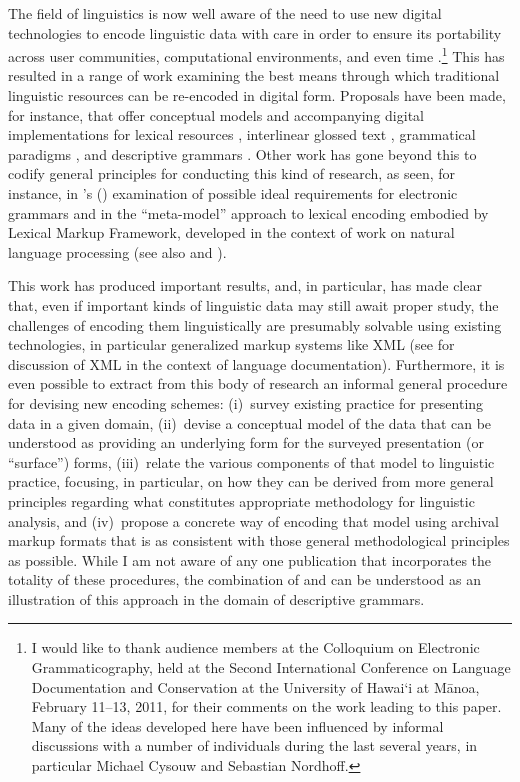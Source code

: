 \documentclass[12pt]{article}
\newcommand\namecite{\citet}
\newcommand{\quotecite}[1]{\citeauthor{#1}'s (\citeyear{#1})}
\renewcommand\cite{\citep}
\begin{document}
The field of linguistics is now well aware of the need to use new digital
technologies to encode linguistic data with care in order to ensure its
portability across user communities, computational environments, and even time
\cite{Bir:Sim:03}.{\footnote{I would like to thank audience members at the
Colloquium on Electronic Grammaticography, held at the Second International
Conference on Language Documentation and Conservation at the University of
Hawai`i at M\=anoa, February 11--13, 2011, for their comments on the work
leading to this paper. Many of the ideas developed here have been influenced by
informal discussions with a number of individuals during the last several years,
in particular Michael Cysouw and Sebastian Nordhoff.}} This has resulted in a
range of work examining the best means through which traditional linguistic
resources can be re-encoded in digital form. Proposals have been made, for
instance, that offer conceptual models and accompanying digital implementations
for lexical resources \cite{BellBird:2000,PoornimaGood:2010}, interlinear
glossed text \cite{BBB:2003,SchroeterThieberger:2006,PalmerErk:2007},
grammatical paradigms \cite{PentonEtAl:2004}, and descriptive grammars
\cite{Good:2004Metadatabase}. Other work has gone beyond this to codify general
principles for conducting this kind of research, as seen, for instance, in
\quotecite{Nordhoff:2009} examination of possible ideal requirements for
electronic grammars and in the ``meta-model'' approach to lexical encoding
embodied by Lexical Markup Framework, developed in the context of work on
natural language processing \cite{Francopoulo:2009} (see also
\namecite{WittenburgEtAl:2002} and \namecite{Trippel:2006,Trippel:2009}).

This work has produced important results, and, in particular, has made clear
that, even if important kinds of linguistic data may still await proper study,
the challenges of encoding them linguistically are presumably solvable using
existing technologies, in particular generalized markup systems like XML (see
\namecite[225--227]{Good:CUPHEL} for discussion of XML in the context of
language documentation). Furthermore, it is even possible to extract from this
body of research an informal general procedure for devising new encoding
schemes: (i)~survey existing practice for presenting data in a given domain,
(ii)~devise a conceptual model of the data that can be understood as providing
an underlying form for the surveyed presentation (or ``surface'') forms,
(iii)~relate the various components of that model to linguistic practice,
focusing, in particular, on how they can be derived from more general principles
regarding what constitutes appropriate  methodology for linguistic analysis, and
(iv)~propose a concrete way of encoding that model using archival markup formats
that is as consistent with those general methodological principles as possible.
While I am not aware of any one publication that incorporates the totality of
these procedures, the combination of \namecite{Good:2004Metadatabase} and
\namecite{Nordhoff:2009} can be understood as an illustration of this approach
in the domain of descriptive grammars.
\end{document}
